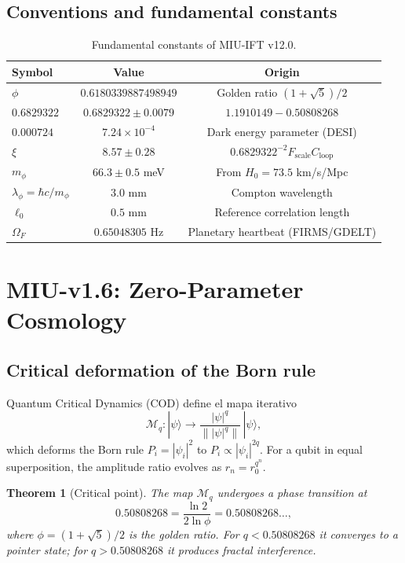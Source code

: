 \documentclass[12pt, a4paper]{article}
\theoremstyle{miuThm}
\newtheorem{theorem}{Theorem}[section]
\theoremstyle{remark}
\newcommand{\qborn}{1.1910149}
\newcommand{\qcrit}{0.50808268}
\newcommand{\DeltaCOD}{0.6829322}
\newcommand{\eps}{0.000724}
\newcommand{\phiGolden}{0.6180339887498949}
\newcommand{\OmegaF}{0.65048305}
\begin{document}
\subsection{Conventions and fundamental constants}
\begin{table}[h!]
\centering
\caption{Fundamental constants of MIU-IFT v12.0.}
\label{tab:ctes}
\begin{tabular}{lcc}
\toprule
\textbf{Symbol} & \textbf{Value} & \textbf{Origin} \\
\midrule
$\phi$ & $\phiGolden$ & Golden ratio $(1+\sqrt5)/2$ \\
$\DeltaCOD$ & $0.6829322 \pm 0.0079$ & $\qborn - \qcrit$ \\
$\eps$ & $7.24\times10^{-4}$ & Dark energy parameter (DESI) \\
$\xi$ & $8.57 \pm 0.28$ & $\DeltaCOD^{-2}F_{\text{scale}}C_{\text{loop}}$ \\
$m_\phi$ & $66.3 \pm 0.5$ meV & From $H_0=73.5$ km/s/Mpc \\
$\lambda_\phi = \hbar c/m_\phi$ & $3.0$ mm & Compton wavelength \\
$\ell_0$ & $0.5$ mm & Reference correlation length \\
$\Omega_F$ & $\OmegaF$ Hz & Planetary heartbeat (FIRMS/GDELT) \\
\bottomrule
\end{tabular}
\end{table}

\section{MIU-v1.6: Zero-Parameter Cosmology}
\label{sec:MIU}

\subsection{Critical deformation of the Born rule}
Quantum Critical Dynamics (COD) define el mapa iterativo
\begin{equation}
\mathcal{M}_q: |\psi\rangle \rightarrow \frac{|\psi|^q}{\| |\psi|^q \|} \, |\psi\rangle,
\end{equation}
which deforms the Born rule $P_i = |\psi_i|^2$ to $P_i \propto |\psi_i|^{2q}$. For a qubit in equal superposition, the amplitude ratio evolves as $r_n = r_0^{q^n}$.

\begin{theorem}[Critical point]
\label{thm:qcrit}
The map $\mathcal{M}_q$ undergoes a phase transition at
\begin{equation}
\qcrit = \frac{\ln 2}{2\ln\phi} = 0.50808268\ldots,
\end{equation}
where $\phi = (1+\sqrt5)/2$ is the golden ratio. For $q<\qcrit$ it converges to a pointer state; for $q>\qcrit$ it produces fractal interference.
\end{theorem}
\end{document}
